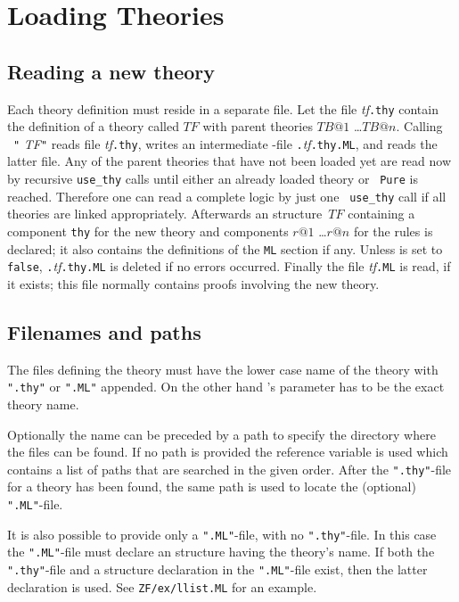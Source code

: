\section{Loading Theories}
\label{LoadingTheories}
\subsection{Reading a new theory}

Each theory definition must reside in a separate file.  Let the file {\it
  tf}{\tt.thy} contain the definition of a theory called $TF$ with parent
theories $TB@1$ \dots $TB@n$.  Calling ~{\tt"}{\it
  TF\/}{\tt"} reads file {\it tf}{\tt.thy}, writes an intermediate {\ML}-file
{\tt.}{\it tf}{\tt.thy.ML}, and reads the latter file.   Any of the parent theories that have not been loaded yet are read now
by recursive {\tt use_thy} calls until either an already loaded theory or {\tt
  Pure} is reached.  Therefore one can read a complete logic by just one {\tt
use_thy} call if all theories are linked appropriately.  Afterwards an {\ML}
structure~$TF$ containing a component {\tt thy} for the new theory and
components $r@1$ \dots $r@n$ for the rules is declared; it also contains the
definitions of the {\tt ML} section if any. Unless
 is set to {\tt false}, {\tt.}{\it tf}{\tt.thy.ML}
is deleted if no errors occurred. Finally the file {\it tf}{\tt.ML} is read, if
it exists; this file normally contains proofs involving the new theory.


\subsection{Filenames and paths}

\begin{warn}
  The files defining the theory must have the lower case name of the theory
  with {\tt".thy"} or {\tt".ML"} appended.  On the other hand
  's parameter has to be the exact theory name.
\end{warn}
Optionally the name can be preceded by a path to specify the directory where
the files can be found.  If no path is provided the reference variable
 is used which contains a list of paths that are
searched in the given order.  After the {\tt".thy"}-file for a theory has
been found, the same path is used to locate the (optional) {\tt".ML"}-file.

It is also possible to provide only a {\tt".ML"}-file, with no
{\tt".thy"}-file.  In this case the {\tt".ML"}-file must declare an \ML{}
structure having the theory's name.  If both the {\tt".thy"}-file and a
structure declaration in the {\tt".ML"}-file exist, then the latter
declaration is used.  See {\tt ZF/ex/llist.ML} for an example.


